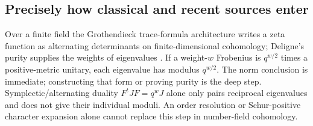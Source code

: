 \documentclass[11pt]{article}
\theoremstyle{definition}\newtheorem{definition}[theorem]{Definition}
\theoremstyle{remark}\newtheorem{remark}[theorem]{Remark}
\begin{document}
\subsection{Precisely how classical and recent sources enter}
Over a finite field the Grothendieck trace-formula architecture writes a zeta function as alternating determinants on finite-dimensional cohomology; Deligne's purity supplies the weights of eigenvalues \cite{SGAFourHalf,DeligneWeilI,DeligneWeilII}. If a weight-$w$ Frobenius is $q^{w/2}$ times a positive-metric unitary, each eigenvalue has modulus $q^{w/2}$. The norm conclusion is immediate; constructing that form or proving purity is the deep step. Symplectic/alternating duality $F^tJF=q^wJ$ alone only pairs reciprocal eigenvalues and does not give their individual moduli. An order resolution or Schur-positive character expansion alone cannot replace this step in number-field cohomology.
\end{document}
